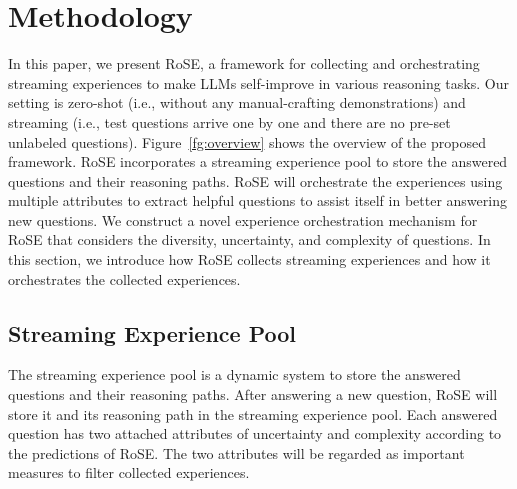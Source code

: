 \documentclass[11pt]{article}
\begin{document}
\section{Methodology}

In this paper, we present RoSE, a framework for collecting and orchestrating streaming experiences to make LLMs self-improve in various reasoning tasks. Our setting is zero-shot (i.e., without any manual-crafting demonstrations) and streaming (i.e., test questions arrive one by one and there are no pre-set unlabeled questions). Figure~\ref{fg:overview} shows the overview of the proposed framework. RoSE incorporates a streaming experience pool to store the answered questions and their reasoning paths. RoSE will orchestrate the experiences using multiple attributes to extract helpful questions to assist itself in better answering new questions. We construct a novel experience orchestration mechanism for RoSE that considers the diversity, uncertainty, and complexity of questions. In this section, we introduce how RoSE collects streaming experiences and how it orchestrates the collected experiences.

\subsection{Streaming Experience Pool}
\label{sec:pool}
The streaming experience pool is a dynamic system to store the answered questions and their reasoning paths. After answering a new question, RoSE will store it and its reasoning path in the streaming experience pool. Each answered question has two attached attributes of uncertainty and complexity according to the predictions of RoSE. The two attributes will be regarded as important measures to filter collected experiences.
\end{document}
